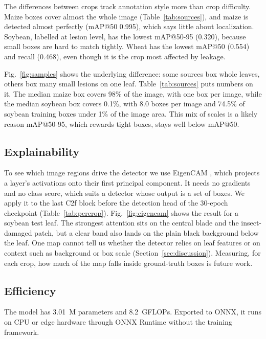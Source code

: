 \documentclass[conference]{IEEEtran}
\begin{document}
The differences between crops track annotation style more than crop difficulty. Maize boxes cover almost the whole image (Table~\ref{tab:sources}), and maize is detected almost perfectly (mAP@50 0.995), which says little about localization. Soybean, labelled at lesion level, has the lowest mAP@50-95 (0.320), because small boxes are hard to match tightly. Wheat has the lowest mAP@50 (0.554) and recall (0.468), even though it is the crop most affected by leakage.

Fig.~\ref{fig:samples} shows the underlying difference: some sources box whole leaves, others box many small lesions on one leaf. Table~\ref{tab:sources} puts numbers on it. The median maize box covers 98\% of the image, with one box per image, while the median soybean box covers 0.1\%, with 8.0 boxes per image and 74.5\% of soybean training boxes under 1\% of the image area. This mix of scales is a likely reason mAP@50-95, which rewards tight boxes, stays well below mAP@50.

\subsection{Explainability}

To see which image regions drive the detector we use EigenCAM \cite{muhammad2020eigencam}, which projects a layer's activations onto their first principal component. It needs no gradients and no class score, which suits a detector whose output is a set of boxes. We apply it to the last C2f block before the detection head of the 30-epoch checkpoint (Table~\ref{tab:percrop}). Fig.~\ref{fig:eigencam} shows the result for a soybean test leaf. The strongest attention sits on the central blade and the insect-damaged patch, but a clear band also lands on the plain black background below the leaf. One map cannot tell us whether the detector relies on leaf features or on context such as background or box scale (Section~\ref{sec:discussion}). Measuring, for each crop, how much of the map falls inside ground-truth boxes is future work.

\subsection{Efficiency}

The model has 3.01~M parameters and 8.2~GFLOPs. Exported to ONNX, it runs on CPU or edge hardware through ONNX Runtime without the training framework.

\end{document}
